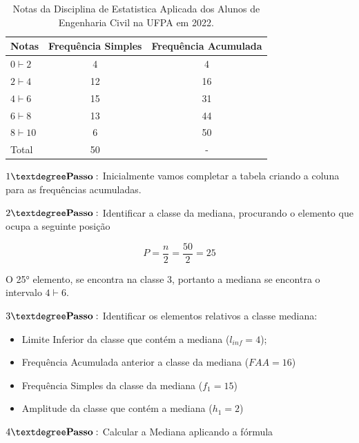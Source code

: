   \begin{table}[!htb]
    \centering
    {
    \caption{Notas da Disciplina de Estatistica Aplicada dos Alunos de Engenharia Civil na UFPA em 2022.}
    \label{exemplomediana}
    \vspace{0.1cm}
\begin{tabular}{l|c|c}
  \hline\hline
  Notas          & Frequência Simples & Frequência Acumulada \\
  \hline\hline
  $0 \vdash 2  $ & 4          & 4                    \\
  $2 \vdash 4  $ & 12         & 16                   \\
  $4 \vdash 6  $ & 15         & 31                   \\
  $6 \vdash 8  $ & 13         & 44                   \\
  $8 \vdash 10 $ & 6          & 50                   \\
  \hline\hline
  Total & 50                  &  - \\
    \hline\hline
\end{tabular}}
\end{table}

$1° \mbox{\textbf{Passo}}:$ Inicialmente vamos completar a tabela criando a coluna para as frequências acumuladas.\vskip0.3cm

$2° \mbox{\textbf{Passo}}:$ Identificar a classe da mediana, procurando o elemento que ocupa a seguinte posição

$$ P=\frac{n}{2}=\frac{50}{2}=25 $$

O 25° elemento, se encontra na classe 3, portanto a mediana se encontra o intervalo $ 4 \vdash 6$.

\vskip0.3cm

$3° \mbox{\textbf{Passo}}:$ Identificar os elementos relativos a classe mediana:

\begin{itemize}
  \item Limite Inferior da classe que contém a mediana ($l_{inf}=4$);
  \item Frequência Acumulada anterior a classe da mediana ($FAA=16$)
  \item Frequência Simples da classe da mediana ($f_{1}=15$)
  \item Amplitude da classe que contém a mediana ($h_{1}=2$)
\end{itemize}

$4° \mbox{\textbf{Passo}}:$ Calcular a Mediana aplicando a fórmula


